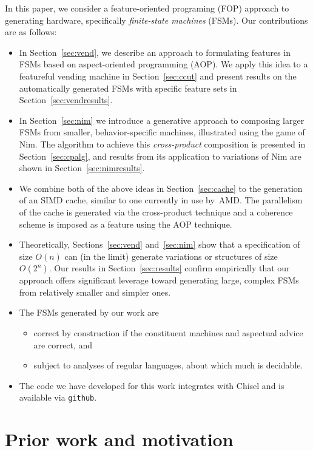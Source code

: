 \documentclass[sigplan,anonymous, review]{acmart}
\begin{document}
In this paper, we consider a feature-oriented programing (FOP) approach to generating hardware, specifically \emph{finite-state machines} (FSMs).   Our contributions are as follows:
\begin{itemize}
    \item In Section~\ref{sec:vend}, we describe an approach to formulating features in FSMs based on aspect-oriented programming (AOP).  We apply this idea to a featureful vending machine in Section~\ref{sec:ccut} and present results on the automatically generated FSMs with specific feature sets in Section~\ref{sec:vendresults}.
    \item In Section~\ref{sec:nim} we introduce a generative approach to composing larger FSMs from smaller, behavior-specific machines, illustrated using the game of Nim.  The algorithm to achieve this \emph{cross-product} composition is presented in Section~\ref{sec:cpalg}, and results from its application to variations of Nim are shown in Section~\ref{sec:nimresults}.
    \item We combine both of the above ideas in Section~\ref{sec:cache} to the generation of an SIMD cache, similar to one currently in use by~AMD.  The parallelism of the cache is generated via the cross-product technique and a coherence scheme is imposed as a feature using the AOP technique.
    \item Theoretically, Sections~\ref{sec:vend} and~\ref{sec:nim} show that a specification of size $O(n)$ can (in the limit) generate variations or structures of size~$O(2^{n})$.  Our results in Section~\ref{sec:results} confirm empirically that our approach offers significant leverage toward generating large, complex FSMs from relatively smaller and simpler ones. 
    \item The FSMs generated by our work are
    \begin{itemize}
        \item correct by construction if the constituent machines and aspectual advice are correct, and
        \item subject to analyses of regular languages, about which much is decidable. 
    \end{itemize}
    \item The code we have developed for this work integrates with Chisel and is available via \texttt{github}.
\end{itemize}


\section{Prior work and motivation}\label{sec:prior}
\end{document}
